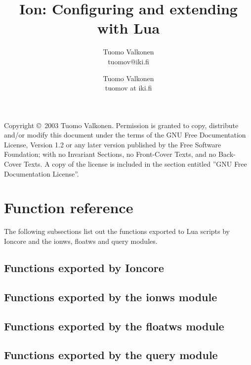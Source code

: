 \documentclass[english,a4paper,11pt,oldtoc,mctitle]{rapport3}
\title{Ion: Configuring and extending with Lua}
\author{Tuomo Valkonen \\ tuomov@iki.fi}
\author{Tuomo Valkonen \\ tuomov at iki.fi}
\begin{document}
\maketitle

Copyright \copyright\  2003 Tuomo Valkonen.
Permission is granted to copy, distribute and/or modify this document
under the terms of the GNU Free Documentation License, Version 1.2
or any later version published by the Free Software Foundation;
with no Invariant Sections, no Front-Cover Texts, and no Back-Cover Texts.
A copy of the license is included in the section entitled ''GNU
Free Documentation License''.

\tableofcontents











\chapter{Function reference}
\label{sec:exports}

The following subsections list out the functions exported to Lua scripts
by Ioncore and the ionws, floatws and query modules.

\section{Functions exported by Ioncore}
\label{sec:ioncoreref}



\section{Functions exported by the ionws module}
\label{sec:ionwsref}



\section{Functions exported by the floatws module}
\label{sec:floatwsref}



\section{Functions exported by the query module}
\label{sec:queryref}
\end{document}
